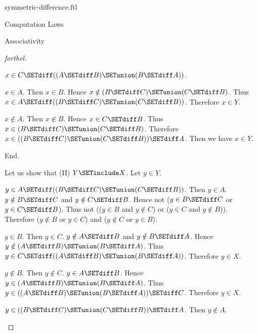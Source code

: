 \documentclass{naproche-library}
\begin{document}
\begin{smodule}[title=Symmetric Difference]{symmetric-difference.ftl}
\begin{sfragment}{Computation Laws}
\begin{sfragment}{Associativity}
\begin{proof}[forthel]
\begin{case}{$x \in C \SETdiff ((A \SETdiff B) \SETunion (B \SETdiff A))$.}
          \begin{case}{$x \in A$.}
            Then $x \in B$.
            Hence $x \notin (B \SETdiff C) \SETunion (C \SETdiff B)$.
            Thus $x \in A \SETdiff ((B \SETdiff C) \SETunion (C \SETdiff B))$.
            Therefore $x \in Y$.
          \end{case}

          \begin{case}{$x \notin A$.}
            Then $x \notin B$.
            Hence $x \in C \SETdiff B$.
            Thus $x \in (B \SETdiff C) \SETunion (C \SETdiff B)$.
            Therefore $x \in ((B \SETdiff C) \SETunion (C \SETdiff B)) \SETdiff A$.
            Then we have $x \in Y$.
          \end{case}
        \end{case}
      End.

      Let us show that (II) $Y \SETinclude X$.
        Let $y \in Y$.

        \begin{case}{$y \in A \SETdiff ((B \SETdiff C) \SETunion (C \SETdiff B))$.}
          Then $y \in A$.
          $y \notin B \SETdiff C$ and $y \notin C \SETdiff B$.
          Hence not ($y \in B \SETdiff C$ or $y \in C \SETdiff B$).
          Thus not (($y \in B$ and $y \notin C$) or ($y \in C$ and $y \notin B$)).
          Therefore ($y \notin B$ or $y \in C$) and ($y \notin C$ or $y \in B$).

          \begin{case}{$y \in B$.}
            Then $y \in C$.
            $y \notin A \SETdiff B$ and $y \notin B \SETdiff A$.
            Hence $y \notin (A \SETdiff B) \SETunion (B \SETdiff A)$.
            Thus $y \in C \SETdiff ((A \SETdiff B) \SETunion (B \SETdiff A))$.
            Therefore $y \in X$.
          \end{case}

          \begin{case}{$y \notin B$.}
            Then $y \notin C$.
            $y \in A \SETdiff B$.
            Hence $y \in (A \SETdiff B) \SETunion (B \SETdiff A)$.
            Thus $y \in ((A \SETdiff B) \SETunion (B \SETdiff A)) \SETdiff C$.
            Therefore $y \in X$.
          \end{case}
        \end{case}

        \begin{case}{$y \in ((B \SETdiff C) \SETunion (C \SETdiff B)) \SETdiff A$.}
          Then $y \notin A$.


\end{case}
\end{proof}
\end{sfragment}
\end{sfragment}
\end{smodule}
\end{document}
